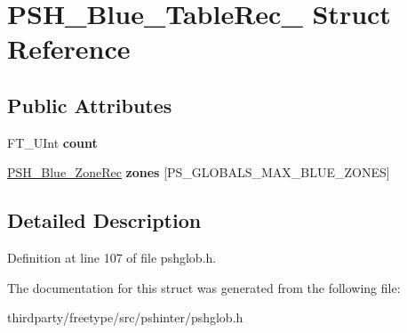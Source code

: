 \hypertarget{struct_p_s_h___blue___table_rec__}{}\section{P\+S\+H\+\_\+\+Blue\+\_\+\+Table\+Rec\+\_\+ Struct Reference}
\label{struct_p_s_h___blue___table_rec__}
\subsection*{Public Attributes}
\begin{DoxyCompactItemize}
\item 
\mbox{\label{struct_p_s_h___blue___table_rec___a20c47e75c99471378ee6cd7bba745e29}} 
F\+T\+\_\+\+U\+Int {\bfseries count}
\item 
\mbox{\label{struct_p_s_h___blue___table_rec___a81f477ba33c7de685c36ac8afa32efa2}} 
\hyperlink{struct_p_s_h___blue___zone_rec__}{P\+S\+H\+\_\+\+Blue\+\_\+\+Zone\+Rec} {\bfseries zones} \mbox{[}P\+S\+\_\+\+G\+L\+O\+B\+A\+L\+S\+\_\+\+M\+A\+X\+\_\+\+B\+L\+U\+E\+\_\+\+Z\+O\+N\+ES\mbox{]}
\end{DoxyCompactItemize}


\subsection{Detailed Description}


Definition at line 107 of file pshglob.\+h.



The documentation for this struct was generated from the following file\+:\begin{DoxyCompactItemize}
\item 
thirdparty/freetype/src/pshinter/pshglob.\+h\end{DoxyCompactItemize}
